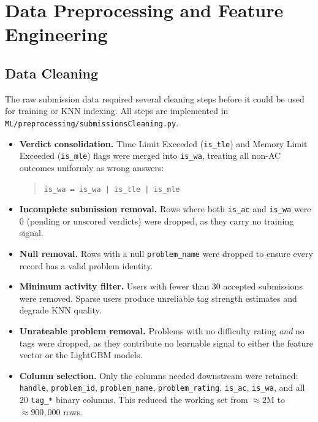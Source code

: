 \documentclass[12pt,a4paper]{article}
\begin{document}
\section{Data Preprocessing and Feature Engineering}

\subsection*{Data Cleaning}

The raw submission data required several cleaning steps before it could be used
for training or KNN indexing. All steps are implemented in
\texttt{ML/preprocessing/submissionsCleaning.py}.

\begin{itemize}
    \item \textbf{Verdict consolidation.} Time Limit Exceeded (\texttt{is\_tle}) and
          Memory Limit Exceeded (\texttt{is\_mle}) flags were merged into
          \texttt{is\_wa}, treating all non-AC outcomes uniformly as wrong answers:
          \begin{quote}
              \texttt{is\_wa = is\_wa | is\_tle | is\_mle}
          \end{quote}

    \item \textbf{Incomplete submission removal.} Rows where both \texttt{is\_ac}
          and \texttt{is\_wa} were 0 (pending or unscored verdicts) were dropped,
          as they carry no training signal.

    \item \textbf{Null removal.} Rows with a null \texttt{problem\_name} were
          dropped to ensure every record has a valid problem identity.

    \item \textbf{Minimum activity filter.} Users with fewer than 30 accepted
          submissions were removed. Sparse users produce unreliable tag strength
          estimates and degrade KNN quality.

    \item \textbf{Unrateable problem removal.} Problems with no difficulty rating
          \emph{and} no tags were dropped, as they contribute no learnable signal
          to either the feature vector or the LightGBM models.

    \item \textbf{Column selection.} Only the columns needed downstream were
          retained: \texttt{handle}, \texttt{problem\_id}, \texttt{problem\_name},
          \texttt{problem\_rating}, \texttt{is\_ac}, \texttt{is\_wa}, and all 20
          \texttt{tag\_*} binary columns. This reduced the working set from
          ${\approx}2\text{M}$ to ${\approx}900{,}000$ rows.
\end{itemize}
\end{document}
